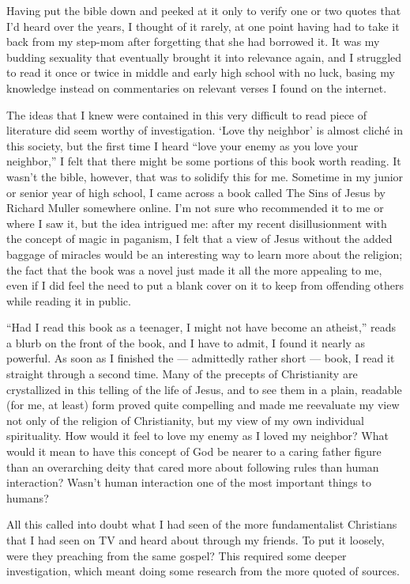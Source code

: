 Having put the bible down and peeked at it only to verify one or two quotes that I'd heard over the years, I thought of it rarely, at one point having had to take it back from my step-mom after forgetting that she had borrowed it. It was my budding sexuality that eventually brought it into relevance again, and I struggled to read it once or twice in middle and early high school with no luck, basing my knowledge instead on commentaries on relevant verses I found on the internet.

The ideas that I knew were contained in this very difficult to read piece of literature did seem worthy of investigation. `Love thy neighbor' is almost cliché in this society, but the first time I heard ``love your enemy as you love your neighbor,'' I felt that there might be some portions of this book worth reading. It wasn't the bible, however, that was to solidify this for me. Sometime in my junior or senior year of high school, I came across a book called The Sins of Jesus by Richard Muller somewhere online. I'm not sure who recommended it to me or where I saw it, but the idea intrigued me: after my recent disillusionment with the concept of magic in paganism, I felt that a view of Jesus without the added baggage of miracles would be an interesting way to learn more about the religion; the fact that the book was a novel just made it all the more appealing to me, even if I did feel the need to put a blank cover on it to keep from offending others while reading it in public.

``Had I read this book as a teenager, I might not have become an atheist,'' reads a blurb on the front of the book, and I have to admit, I found it nearly as powerful. As soon as I finished the --- admittedly rather short --- book, I read it straight through a second time. Many of the precepts of Christianity are crystallized in this telling of the life of Jesus, and to see them in a plain, readable (for me, at least) form proved quite compelling and made me reevaluate my view not only of the religion of Christianity, but my view of my own individual spirituality. How would it feel to love my enemy as I loved my neighbor? What would it mean to have this concept of God be nearer to a caring father figure than an overarching deity that cared more about following rules than human interaction? Wasn't human interaction one of the most important things to humans?

All this called into doubt what I had seen of the more fundamentalist Christians that I had seen on TV and heard about through my friends. To put it loosely, were they preaching from the same gospel? This required some deeper investigation, which meant doing some research from the more quoted of sources.

